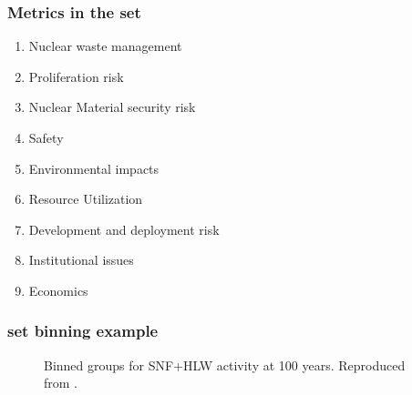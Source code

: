\begin{frame}
    \frametitle{Metrics in the \Gls{set}}
    \begin{enumerate}
    \item Nuclear waste management
    \item Proliferation risk
    \item Nuclear Material security risk
    \item Safety
    \item Environmental impacts
    \item Resource Utilization
    \item Development and deployment risk
    \item Institutional issues
    \item Economics
\end{enumerate}
\end{frame}
\begin{frame}
  \frametitle{\Gls{set} binning example}
        
  \begin{figure}[htbp!]
    \begin{center}
      \resizebox{0.65\columnwidth}{!}{}
    \end{center}
          \caption{Binned groups for SNF+HLW activity at 100 years. Reproduced from \cite{wigeland_nuclear_2014}.}
    \label{fig:set_activity_bins}
  \end{figure}
\end{frame}